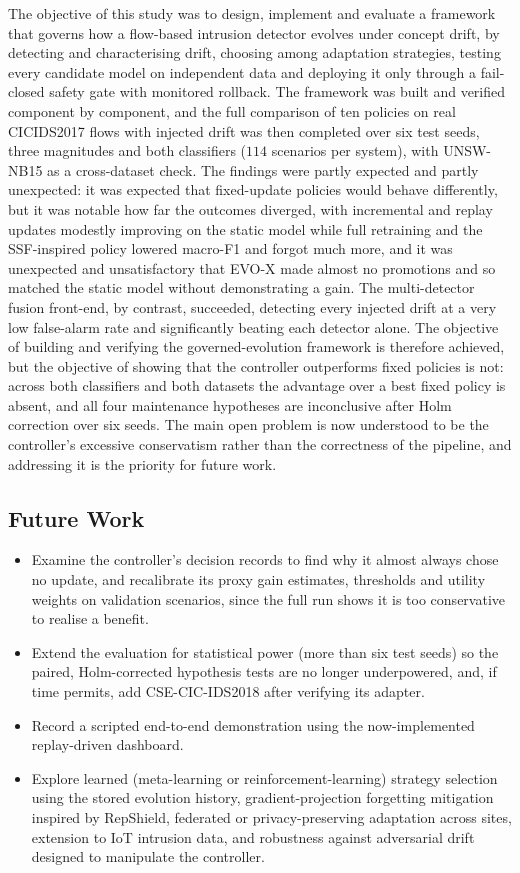 \documentclass{article}
\begin{document}
The objective of this study was to design, implement and evaluate a framework that governs how a flow-based intrusion detector evolves under concept drift, by detecting and characterising drift, choosing among adaptation strategies, testing every candidate model on independent data and deploying it only through a fail-closed safety gate with monitored rollback. The framework was built and verified component by component, and the full comparison of ten policies on real CICIDS2017 flows with injected drift was then completed over six test seeds, three magnitudes and both classifiers ($114$ scenarios per system), with UNSW-NB15 as a cross-dataset check. The findings were partly expected and partly unexpected: it was expected that fixed-update policies would behave differently, but it was notable how far the outcomes diverged, with incremental and replay updates modestly improving on the static model while full retraining and the SSF-inspired policy lowered macro-F1 and forgot much more, and it was unexpected and unsatisfactory that EVO-X made almost no promotions and so matched the static model without demonstrating a gain. The multi-detector fusion front-end, by contrast, succeeded, detecting every injected drift at a very low false-alarm rate and significantly beating each detector alone. The objective of building and verifying the governed-evolution framework is therefore achieved, but the objective of showing that the controller outperforms fixed policies is not: across both classifiers and both datasets the advantage over a best fixed policy is absent, and all four maintenance hypotheses are inconclusive after Holm correction over six seeds. The main open problem is now understood to be the controller's excessive conservatism rather than the correctness of the pipeline, and addressing it is the priority for future work.

\subsection*{Future Work}

\begin{itemize}
\item Examine the controller's decision records to find why it almost always chose no update, and recalibrate its proxy gain estimates, thresholds and utility weights on validation scenarios, since the full run shows it is too conservative to realise a benefit.
\item Extend the evaluation for statistical power (more than six test seeds) so the paired, Holm-corrected hypothesis tests are no longer underpowered, and, if time permits, add CSE-CIC-IDS2018 after verifying its adapter.
\item Record a scripted end-to-end demonstration using the now-implemented replay-driven dashboard.
\item Explore learned (meta-learning or reinforcement-learning) strategy selection using the stored evolution history, gradient-projection forgetting mitigation inspired by RepShield, federated or privacy-preserving adaptation across sites, extension to IoT intrusion data, and robustness against adversarial drift designed to manipulate the controller.
\end{itemize}
\end{document}
